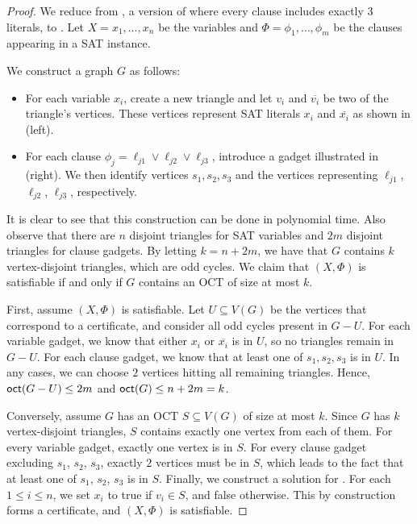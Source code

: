 \begin{proof}
  We reduce from , a version of 
  where every clause includes exactly $3$ literals, to .
  Let $X=x_1,\ldots,x_n$ be the variables and $\Phi=\phi_1,\ldots,\phi_m$ be the clauses
  appearing in a SAT instance.

  We construct a graph $G$ as follows:
  \begin{itemize}
    \item For each variable $x_i$, create a new triangle and let $v_i$ and $\overline{v_i}$
    be two of the triangle's vertices.
    These vertices represent SAT literals $x_i$ and $\overline{x_i}$ as shown in  (left).
    \item For each clause $\phi_j=\ell_{j1} \lor \ell_{j2} \lor \ell_{j3}$, introduce a gadget illustrated in  (right).
    We then identify vertices $s_1, s_2, s_3$ and the vertices representing $\ell_{j1}$, $\ell_{j2}$, $\ell_{j3}$,
    respectively.
  \end{itemize}

  It is clear to see that this construction can be done in polynomial time.
  Also observe that there are $n$ disjoint triangles for SAT variables
  and $2m$ disjoint triangles for clause gadgets.
  By letting $k=n+2m$, we have that $G$ contains $k$ vertex-disjoint triangles, which are odd cycles.
  We claim that $(X,\Phi)$ is satisfiable if and only if $G$ contains an OCT of size at most $k$.

  First, assume $(X,\Phi)$ is satisfiable.
  Let $U \subseteq V(G)$ be the vertices that correspond to a certificate,
  and consider all odd cycles present in $G-U$.
  For each variable gadget, we know that either $x_i$ or $\overline{x_i}$ is in $U$,
  so no triangles remain in $G-U$.
  For each clause gadget, we know that at least one of $s_1, s_2, s_3$ is in $U$.
  In any cases, we can choose $2$ vertices hitting all remaining triangles.
  Hence, $\textnormal{\textsf{oct}}(G-U) \leq 2m$ and $\textnormal{\textsf{oct}}(G) \leq n + 2m = k$.

  Conversely, assume $G$ has an OCT $S \subseteq V(G)$ of size at most $k$.
  Since $G$ has $k$ vertex-disjoint triangles, $S$ contains exactly one vertex from each of them.
  For every variable gadget, exactly one vertex is in $S$.
  For every clause gadget excluding $s_1$, $s_2$, $s_3$, exactly $2$ vertices must be in $S$,
  which leads to the fact that at least one of $s_1$, $s_2$, $s_3$ is in $S$.
  Finally, we construct a solution for .
  For each $1 \leq i \leq n$,
  we set $x_i$ to \textsf{true} if $v_i \in S$,
  and \textsf{false} otherwise.
  This by construction forms a certificate, and $(X,\Phi)$ is satisfiable.
\end{proof}

